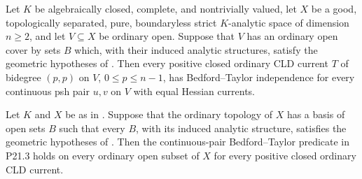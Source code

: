 \begin{corollary}
\label{cor:p213-residual-picard-open-polycylinder-mixed-tower-cover-bt}
Let $K$ be algebraically closed, complete, and nontrivially valued, let
$X$ be a good, topologically separated, pure, boundaryless strict
$K$-analytic space of dimension $n\geq2$, and let $V\subseteq X$ be
ordinary open.  Suppose that $V$ has an ordinary open cover by sets $B$
which, with their induced analytic structures, satisfy the geometric
hypotheses of
.  Then
every positive closed ordinary CLD current $T$ of bidegree $(p,p)$ on $V$,
$0\leq p\leq n-1$, has Bedford--Taylor independence for every continuous
psh pair $u,v$ on $V$ with equal Hessian currents.
\end{corollary}

\begin{corollary}
\label{cor:p213-residual-picard-open-polycylinder-mixed-tower-basis-bt}
Let $K$ and $X$ be as in
.
Suppose that the ordinary topology of $X$ has a basis of open sets $B$ such
that every $B$, with its induced analytic structure, satisfies the
geometric hypotheses of
.  Then the
continuous-pair Bedford--Taylor predicate in P21.3 holds on every ordinary
open subset of $X$ for every positive closed ordinary CLD current.
\end{corollary}
